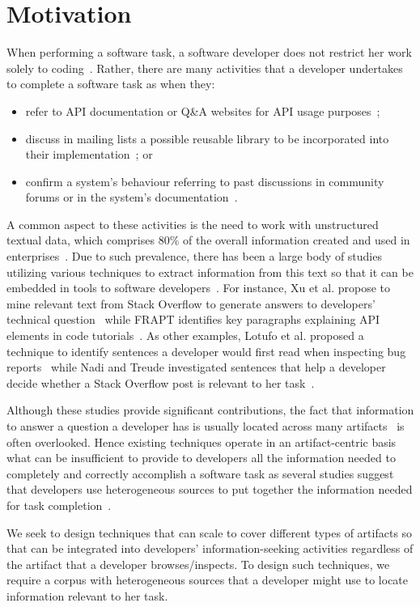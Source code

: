 

\section{Motivation}
\label{cp4:motivation}


When performing a software task, a software developer does not restrict her work
solely to coding~\cite{Meyer2017}.
Rather, there are many activities that a developer undertakes to complete a software task
as when they:



\begin{itemize}
    \item refer to API documentation or Q\&A websites for API usage purposes~\cite{umarji2008archetypal, Singer1998, robillard2011field};
    \item discuss in mailing lists a possible reusable library to be incorporated into their implementation~\cite{umarji2008archetypal, Bacchelli2012}; or
    \item confirm a system's behaviour referring to past discussions in community forums or in the system's documentation~\cite{Arya2019, Lotufo2012, Singer1998}.
\end{itemize}


A common aspect to these activities is the need to work with unstructured textual data, which comprises 80\% of the overall information created and used in enterprises~\cite{Bavota2014, holzinger2013}.
Due to such prevalence, there has been a large body of studies utilizing various techniques to extract
information from this text so that it can be embedded in
tools to software developers~\cite{Bavota2014, Xu2017, Robillard2015, Lotufo2012}. For instance, Xu et al. propose to mine relevant text from Stack Overflow
to generate answers to developers' technical question~\cite{Xu2017}
while FRAPT identifies key paragraphs explaining API elements in code tutorials~\cite{Jiang2017}.
As other examples, Lotufo et al. proposed a technique to identify sentences a developer would first read when inspecting bug reports~\cite{Lotufo2012} while Nadi and Treude investigated sentences that help a developer decide whether a Stack Overflow post is relevant to her task~\cite{nadi2020}.




Although these studies provide significant contributions, the fact that information to answer a question a developer has is usually located across many artifacts~\cite{Rastkar2013t} is often overlooked.
Hence existing techniques operate in an artifact-centric basis
what can be insufficient to provide to developers all the information needed
to completely and correctly accomplish a software task as several studies suggest that developers use heterogeneous sources to put together the information needed for task completion~\cite{josyula2018, Li2013, rao2020}.




We seek to design techniques that can scale to cover different types of artifacts
so that can be integrated into developers' information-seeking activities regardless of the artifact that a developer browses/inspects.
To design such techniques, we require a corpus with heterogeneous sources that a developer
might use to locate information relevant to her task.
